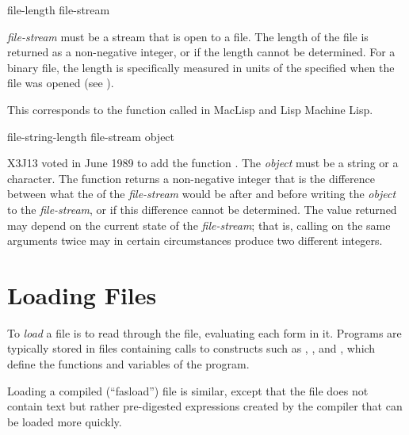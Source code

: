 \begin{defun}[Function]
file-length file-stream

\emph{file-stream} must be a stream that is open to a file.
The length of the file is returned as a non-negative integer,
or {\false} if the length cannot be determined.
For a binary file,
the length is specifically
measured in units of the  specified
when the file was opened (see ).

\beforenoterule
\begin{incompatibility}
This corresponds to the function
called  in MacLisp and Lisp Machine Lisp.
\end{incompatibility}
\afternoterule
\end{defun}


\begin{newer}
\begin{defun}[Function]
file-string-length file-stream object

X3J13 voted in June 1989  to add
the function .
The \emph{object} must be a string or a character.  The function
 returns a non-negative integer
that is the difference between what the  of the
\emph{file-stream} would be after and before writing the \emph{object}
to the \emph{file-stream}, or  if this
difference cannot be determined.  The value returned may
depend on the current state of the \emph{file-stream}; that is, calling
 on the same arguments twice may in certain circumstances
produce two different integers.
\end{defun}
\end{newer}

\section{Loading Files}

To \emph{load} a file is to read through the file, evaluating each form in
it.  Programs are typically stored in files containing calls to
constructs such as , ,
and , which define
the functions and variables of the program.

Loading a compiled (``fasload'') file is similar, except that the file does not
contain text but rather pre-digested expressions created by the
compiler that can be loaded more quickly.

